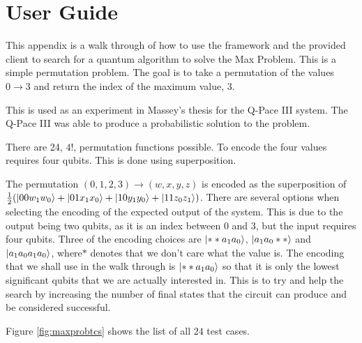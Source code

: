 \chapter{User Guide}

This appendix is a walk through of how to use the framework and the provided client to search for a quantum algorithm to solve the Max Problem.
This is a simple permutation problem.
The goal is to take a permutation of the values $0\rightarrow3$ and return the index of the maximum value, $3$.

This is used as an experiment in Massey's thesis\cite{masseythesis} for the Q-Pace III system.
The Q-Pace III was able to produce a probabilistic solution to the problem.

There are 24, $4!$, permutation functions possible.
To encode the four values requires four qubits.
This is done using superposition.

The permutation $(0,1,2,3)\rightarrow(w,x,y,z)$ is encoded as the superposition of $\frac{1}{2}(\left\vert{00w_1w_0}\right\rangle+\left\vert{01x_1x_0}\right\rangle+\left\vert{10y_1y_0}\right\rangle+\left\vert{11z_0z_1}\right\rangle)$.
There are several options when selecting the encoding of the expected output of the system.
This is due to the output being two qubits, as it is an index between $0$ and $3$, but the input requires four qubits.
Three of the encoding choices are $\left\vert{**a_1a_0}\right\rangle$, $\left\vert{a_1a_0**}\right\rangle$ and $\left\vert{a_1a_0a_1a_0}\right\rangle$, where$*$ denotes that we don't care what the value is.
The encoding that we shall use in the walk through is $\left\vert{**a_1a_0}\right\rangle$ so that it is only the lowest significant qubits that we are actually interested in.
This is to try and help the search by increasing the number of final states that the circuit can produce and be considered successful.

Figure \ref{fig:maxprobtcs} shows the list of all $24$ test cases.

